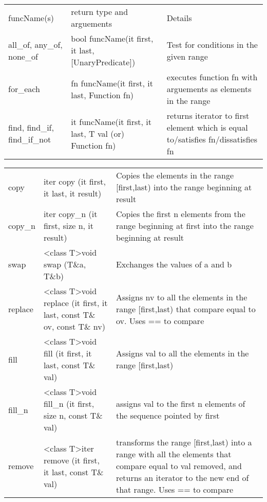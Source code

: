 

\begin{tabular}{p{2cm}|p{5cm}|p{5.5cm}}
	funcName(s)	&	return type and arguements	&	Details	\\
	all\_of, any\_of, none\_of	& bool funcName(it first, it last, [UnaryPredicate])	&	Test for conditions in the given range	\\
	for\_each 	&	fn funcName(it first, it last, Function fn) &	executes function fn with arguements as elements in the range \\
	find, find\_if, find\_if\_not	&	it funcName(it first, it last, T val (or) Function fn)	&	returns iterator to first element which is equal to/satisfies fn/dissatisfies fn \\

\end{tabular}


\begin{tabular}{p{2cm}|p{5cm}|p{5.5cm}}
	copy   &   iter copy (it first, it last, it result)   &   Copies the elements in the range [first,last) into the range beginning at result \\
	copy\_n   &   iter copy\_n (it first, size n, it result)   &   Copies the first n elements from the range beginning at first into the range beginning at result \\
	swap   &   \textless class T\textgreater void swap (T\&a, T\&b)   &   Exchanges the values of a and b \\
	replace   &   \textless class T\textgreater void replace (it first, it last, const T\& ov, const T\& nv)   &   Assigns nv to all the elements in the range [first,last) that compare equal to ov. Uses == to compare \\
	fill   &   \textless class T\textgreater void fill (it first, it last, const T\& val)   &   Assigns val to all the elements in the range [first,last) \\
	fill\_n   &   \textless class T\textgreater void fill\_n (it first, size n, const T\& val)   &    assigns val to the first n elements of the sequence pointed by first \\
	remove   &   \textless class T\textgreater iter remove (it first, it last, const T\& val)   &   transforms the range [first,last) into a range with all the elements that compare equal to val removed, and returns an iterator to the new end of that range. Uses == to compare \\
\end{tabular}


